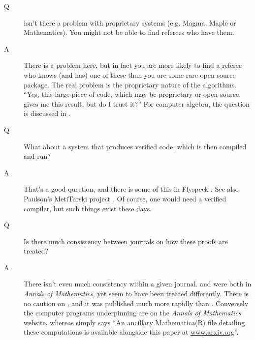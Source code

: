 \begin{description}
\item[Q]Isn't there a problem with proprietary systems (e.g. Magma, Maple or Mathematics). You might not be able to find referees who have them.
\item[A]There is a problem here, but in fact you are more likely to find a referee who knows (and has) one of these than you are some rare open-source package. The real problem is the proprietary nature of the algorithms. ``Yes, this large piece of code, which may be proprietary or open-source, gives me this result, but do I trust it?''  For computer algebra, the question is discussed in \cite{Davenport2017z}.
\item[Q]What about a system that produces verified code, which is then compiled and run?
\item[A]That's a good question, and there is some of this in Flyspeck \cite{Halesetal2017a}.  See also Paulson's MetiTarski project \cite{AkbarpourPaulson2010}.
Of course, one would need a verified compiler, but such things exist these days.
\item[Q]Is there much consistency between journals on how these proofs are treated?
\item[A]There isn't even much consistency within a given journal. \cite{Hales2005} and \cite{Maynard2015a} were both in \emph{Annals of Mathematics}, yet seem to have been treated differently. There is no caution on \cite{Maynard2015a}, and it was published much more rapidly than  \cite{Hales2005}. Conversely the computer programs underpinning \cite{Hales2005} are on the \emph{Annals of Mathematics} website, whereas \cite{Maynard2015a} simply says ``An ancillary Mathematica(R) file detailing these computations is available alongside this
paper at \url{ www.arxiv.org}''.
\end{description}
